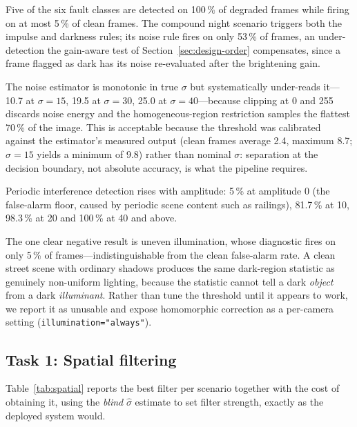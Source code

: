 \documentclass[conference,10pt]{IEEEtran}
\begin{document}
Five of the six fault classes are detected on 100\,\% of degraded frames while
firing on at most 5\,\% of clean frames. The compound night scenario triggers
both the impulse and darkness rules; its noise rule fires on only 53\,\% of
frames, an under-detection the gain-aware test of
Section~\ref{sec:design-order} compensates, since a frame flagged as dark has
its noise re-evaluated after the brightening gain.


The noise estimator is monotonic in true $\sigma$ but systematically
under-reads it---10.7 at $\sigma{=}15$, 19.5 at $\sigma{=}30$, 25.0 at
$\sigma{=}40$---because clipping at 0 and 255 discards noise energy and the
homogeneous-region restriction samples the flattest 70\,\% of the image. This
is acceptable because the threshold was calibrated against the estimator's
measured output (clean frames average 2.4, maximum 8.7; $\sigma{=}15$ yields a
minimum of 9.8) rather than nominal $\sigma$: separation at the decision
boundary, not absolute accuracy, is what the pipeline requires.

Periodic interference detection rises with amplitude: 5\,\% at amplitude 0 (the
false-alarm floor, caused by periodic scene content such as railings), 81.7\,\%
at 10, 98.3\,\% at 20 and 100\,\% at 40 and above.

The one clear negative result is uneven illumination, whose diagnostic fires on
only 5\,\% of frames---indistinguishable from the clean false-alarm rate. A
clean street scene with ordinary shadows produces the same dark-region
statistic as genuinely non-uniform lighting, because the statistic cannot tell
a dark \emph{object} from a dark \emph{illuminant}. Rather than tune the
threshold until it appears to work, we report it as unusable and expose
homomorphic correction as a per-camera setting
(\texttt{illumination="always"}).

\subsection{Task 1: Spatial filtering}\label{sec:res-spatial}
Table~\ref{tab:spatial} reports the best filter per scenario together with the
cost of obtaining it, using the \emph{blind} $\hat\sigma$ estimate to set filter
strength, exactly as the deployed system would.
\end{document}
